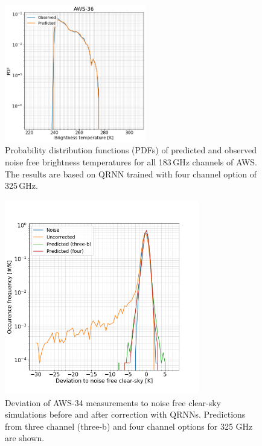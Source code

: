 \documentclass[12pt]{article}
\begin{document}
\begin{figure}[!p]
	\includegraphics[height=60mm]{distribution_predicted_C36}
	\caption{ Probability distribution functions (PDFs) of predicted and observed noise free brightness temperatures for all 183\,GHz channels of AWS. The results are based on QRNN trained with four channel option of 325\,GHz.}
	\label{fig:pdf:qrnn}
\end{figure}
\begin{figure}[!p]
	\centering
	\includegraphics[height=85mm]{Channel_C34.png}
	\caption{Deviation of AWS-34 measurements to noise free clear-sky
		simulations before and after correction with QRNNs. Predictions from three channel (three-b) and four channel options for 325 GHz are shown. }
	\label{fig:qrnn_C34:deviations}
\end{figure}
\end{document}
